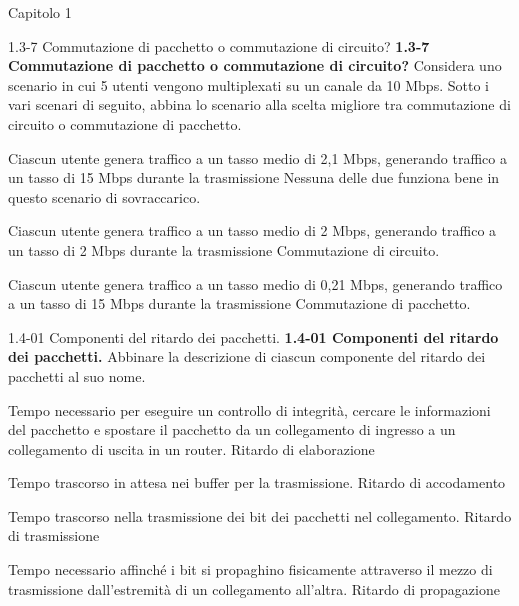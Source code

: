 \documentclass[a4paper]{article}
\begin{document}
\begin{quiz}{Capitolo 1}
\begin{matching}[points=1,shuffle=true]{1.3-7 Commutazione di pacchetto o commutazione di circuito?}
\textbf{1.3-7 Commutazione di pacchetto o commutazione di circuito?}
Considera uno scenario in cui 5 utenti vengono multiplexati su un canale da 10 Mbps.
Sotto i vari scenari di seguito, abbina lo scenario alla scelta migliore tra commutazione di circuito o commutazione di pacchetto.

\item Ciascun utente genera traffico a un tasso medio di 2,1 Mbps, generando traffico a un tasso di 15 Mbps durante la trasmissione \answer Nessuna delle due funziona bene in questo scenario di sovraccarico.
\item Ciascun utente genera traffico a un tasso medio di 2 Mbps, generando traffico a un tasso di 2 Mbps durante la trasmissione \answer Commutazione di circuito.
\item Ciascun utente genera traffico a un tasso medio di 0,21 Mbps, generando traffico a un tasso di 15 Mbps durante la trasmissione \answer Commutazione di pacchetto.
\end{matching}

\begin{matching}[points=1,shuffle=true]{1.4-01 Componenti del ritardo dei pacchetti.}
\textbf{1.4-01 Componenti del ritardo dei pacchetti.}
Abbinare la descrizione di ciascun componente del ritardo dei pacchetti al suo nome.

\item Tempo necessario per eseguire un controllo di integrità, cercare le informazioni del pacchetto e spostare il pacchetto da un collegamento di ingresso a un collegamento di uscita in un router. \answer Ritardo di elaborazione
\item Tempo trascorso in attesa nei buffer per la trasmissione. \answer Ritardo di accodamento
\item Tempo trascorso nella trasmissione dei bit dei pacchetti nel collegamento. \answer Ritardo di trasmissione
\item Tempo necessario affinché i bit si propaghino fisicamente attraverso il mezzo di trasmissione dall'estremità di un collegamento all'altra. \answer Ritardo di propagazione
\end{matching}


\end{quiz}
\end{document}
